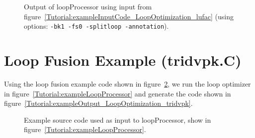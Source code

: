 \begin{figure}[!h]
{\indent
{\mySmallFontSize


\begin{latexonly}
   
\end{latexonly}

\begin{htmlonly}
   
\end{htmlonly}

}
}
\caption{Output of loopProcessor using input from figure~\ref{Tutorial:exampleInputCode_LoopOptimization_lufac}
    (using options: {\tt -bk1 -fs0  -splitloop -annotation}).}
\label{Tutorial:exampleOutput_LoopOptimization_lufac}
\end{figure}


 \clearpage
\section{Loop Fusion Example (tridvpk.C)}

   Using the loop fusion example code shown in 
figure~\ref{Tutorial:exampleInputCode_LoopOptimization_tridvpk}, we run the loop optimizer in
figure~\ref{Tutorial:exampleLoopProcessor} and generate the code shown in 
figure~\ref{Tutorial:exampleOutput_LoopOptimization_tridvpk}.

\begin{figure}[!h]
{\indent
{\mySmallFontSize


\begin{latexonly}
   
\end{latexonly}

\begin{htmlonly}
   
\end{htmlonly}

}
}
\caption{Example source code used as input to loopProcessor, show in figure~\ref{Tutorial:exampleLoopProcessor}.}
\label{Tutorial:exampleInputCode_LoopOptimization_tridvpk}
\end{figure}

